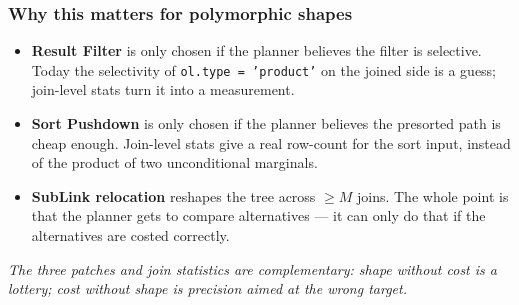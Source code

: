\documentclass{beamer}
\begin{document}
%

\begin{frame}\frametitle{Why this matters for polymorphic shapes}
\vspace{-1mm}

\begin{itemize}\small
  \item \textbf{Result Filter} is only chosen if the planner
        believes the filter is selective.  Today the selectivity of
        \texttt{ol.type = 'product'} on the joined side is a
        guess; join-level stats turn it into a measurement.
  \item \textbf{Sort Pushdown} is only chosen if the planner
        believes the presorted path is cheap enough.  Join-level
        stats give a real row-count for the sort input, instead of
        the product of two unconditional marginals.
  \item \textbf{SubLink relocation} reshapes the tree across
        $\geq$$M$ joins.  The whole point is that the planner gets
        to compare alternatives --- it can only do that if the
        alternatives are costed correctly.
\end{itemize}

\vspace{2mm}
\begin{center}\small
{}
\end{center}

\vspace{1mm}
{\scriptsize\itshape The three patches and join statistics are
complementary: shape without cost is a lottery; cost without shape
is precision aimed at the wrong target.}
\end{frame}
\end{document}
